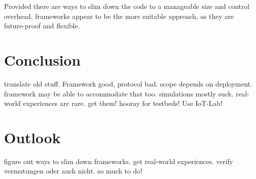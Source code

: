 \documentclass[a4paper,10pt]{scrartcl}
\begin{document}
Provided there are ways to slim down the code to a manageable size and control overhead, frameworks appear to be the more suitable approach, as they are future-proof and flexible.


\section{Conclusion}
\label{sec:conclusion}
translate old stuff. Framework good, protocol bad. scope depends on deployment. framework may be able to accommodate that too. simulations mostly suck. real-world experiences are rare. get them!  hooray for testbeds! Use IoT-Lab!

\section{Outlook}
\label{sec:outlook}
figure out ways to slim down frameworks. get real-world experiences. verify vermutungen oder auch nicht. so much to do!


\printglossaries

{\small


}
\end{document}
